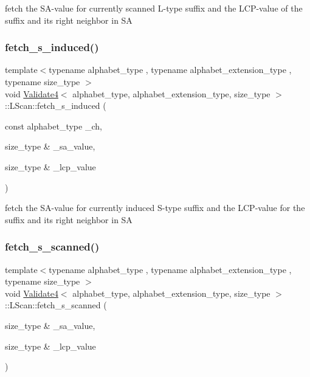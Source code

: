 fetch the S\+A-\/value for currently scanned L-\/type suffix and the L\+C\+P-\/value of the suffix and its right neighbor in SA 

\mbox{\label{struct_validate4_1_1_l_scan_a37796b2c2e404a1bdf1362e7b1794fee}} 
\subsubsection{\texorpdfstring{fetch\+\_\+s\+\_\+induced()}{fetch\_s\_induced()}}
{\footnotesize\ttfamily template$<$typename alphabet\+\_\+type , typename alphabet\+\_\+extension\+\_\+type , typename size\+\_\+type $>$ \\
void \hyperlink{class_validate4}{Validate4}$<$ alphabet\+\_\+type, alphabet\+\_\+extension\+\_\+type, size\+\_\+type $>$\+::L\+Scan\+::fetch\+\_\+s\+\_\+induced (\begin{DoxyParamCaption}\item[{const alphabet\+\_\+type}]{\+\_\+ch,  }\item[{size\+\_\+type \&}]{\+\_\+sa\+\_\+value,  }\item[{size\+\_\+type \&}]{\+\_\+lcp\+\_\+value }\end{DoxyParamCaption})\hspace{0.3cm}{\ttfamily [inline]}}



fetch the S\+A-\/value for currently induced S-\/type suffix and the L\+C\+P-\/value for the suffix and its right neighbor in SA 

\mbox{\label{struct_validate4_1_1_l_scan_a4e402bf4909c1502337801bd56e22be2}} 
\subsubsection{\texorpdfstring{fetch\+\_\+s\+\_\+scanned()}{fetch\_s\_scanned()}}
{\footnotesize\ttfamily template$<$typename alphabet\+\_\+type , typename alphabet\+\_\+extension\+\_\+type , typename size\+\_\+type $>$ \\
void \hyperlink{class_validate4}{Validate4}$<$ alphabet\+\_\+type, alphabet\+\_\+extension\+\_\+type, size\+\_\+type $>$\+::L\+Scan\+::fetch\+\_\+s\+\_\+scanned (\begin{DoxyParamCaption}\item[{size\+\_\+type \&}]{\+\_\+sa\+\_\+value,  }\item[{size\+\_\+type \&}]{\+\_\+lcp\+\_\+value }\end{DoxyParamCaption})\hspace{0.3cm}{\ttfamily [inline]}}



